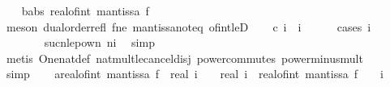 \begin{isabellebody}
\isanewline
\ \ \isamarkupfalse%
\ b{\isacharcolon}{\kern0pt}{\isachardoublequoteopen}abs\ {\isacharparenleft}{\kern0pt}real{\isacharunderscore}{\kern0pt}of{\isacharunderscore}{\kern0pt}int\ {\isacharparenleft}{\kern0pt}mantissa\ f{\isacharparenright}{\kern0pt}{\isacharparenright}{\kern0pt}\ {\isasymge}\ {}{\isachardoublequoteclose}\ \isanewline
\ \ \ \ \isamarkupfalse%
\ {\isacharparenleft}{\kern0pt}meson\ dual{\isacharunderscore}{\kern0pt}order{\isachardot}{\kern0pt}refl\ f{\isacharunderscore}{\kern0pt}ne{\isacharunderscore}{\kern0pt}{}\ mantissa{\isacharunderscore}{\kern0pt}noteq{\isacharunderscore}{\kern0pt}{}\ of{\isacharunderscore}{\kern0pt}int{\isacharunderscore}{\kern0pt}leD{\isacharparenright}{\kern0pt}\isanewline
\isanewline
\ \ \isamarkupfalse%
\ c{\isacharcolon}{\kern0pt}\ {\isachardoublequoteopen}{}{\isacharasterisk}{\kern0pt}i\ {\isasymle}\ {}{\isacharcircum}{\kern0pt}i{\isachardoublequoteclose}\isanewline
\ \ \ \ \isamarkupfalse%
\ {\isacharparenleft}{\kern0pt}cases\ {\isachardoublequoteopen}i\ {\isachargreater}{\kern0pt}\ {}{\isachardoublequoteclose}{\isacharparenright}{\kern0pt}\isanewline
\ \ \ \ \ \ \isamarkupfalse%
\ suc{\isacharunderscore}{\kern0pt}n{\isacharunderscore}{\kern0pt}le{\isacharunderscore}{\kern0pt}{}{\isacharunderscore}{\kern0pt}pow{\isacharunderscore}{\kern0pt}n{\isacharbrackleft}{\kern0pt}\ n{\isacharequal}{\kern0pt}{\isachardoublequoteopen}i{\isacharminus}{\kern0pt}{}{\isachardoublequoteclose}{\isacharbrackright}{\kern0pt}\ \isamarkupfalse%
\ simp\isanewline
\ \ \ \ \ \isamarkupfalse%
\ {\isacharparenleft}{\kern0pt}metis\ One{\isacharunderscore}{\kern0pt}nat{\isacharunderscore}{\kern0pt}def\ nat{\isacharunderscore}{\kern0pt}mult{\isacharunderscore}{\kern0pt}le{\isacharunderscore}{\kern0pt}cancel{\isacharunderscore}{\kern0pt}disj\ power{\isacharunderscore}{\kern0pt}commutes\ power{\isacharunderscore}{\kern0pt}minus{\isacharunderscore}{\kern0pt}mult{\isacharparenright}{\kern0pt}\isanewline
\ \ \ \ \isamarkupfalse%
\ simp\isanewline
\isanewline
\ \ \isamarkupfalse%
\ a{\isacharcolon}{\kern0pt}{\isachardoublequoteopen}{\isasymbar}real{\isacharunderscore}{\kern0pt}of{\isacharunderscore}{\kern0pt}int\ {\isacharparenleft}{\kern0pt}mantissa\ f{\isacharparenright}{\kern0pt}{\isasymbar}\ {\isacharasterisk}{\kern0pt}\ {\isacharparenleft}{\kern0pt}real\ i\ {\isacharplus}{\kern0pt}\ {}{\isacharparenright}{\kern0pt}\ {\isacharplus}{\kern0pt}\ real\ i\ {\isasymle}\ {\isasymbar}real{\isacharunderscore}{\kern0pt}of{\isacharunderscore}{\kern0pt}int\ {\isacharparenleft}{\kern0pt}mantissa\ f{\isacharparenright}{\kern0pt}{\isasymbar}\ {\isacharasterisk}{\kern0pt}\ {}\ {\isacharcircum}{\kern0pt}\ i\ {\isacharplus}{\kern0pt}\ {}{\isachardoublequoteclose}\ \isanewline

\end{isabellebody}
